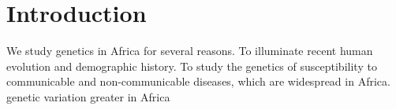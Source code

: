 \chapter{Introduction}
\ifpdf
    \graphicspath{{Introduction/IntroductionFigs/PNG/}{Introduction/IntroductionFigs/PDF/}{Introduction/IntroductionFigs/}}
\else
    \graphicspath{{Introduction/IntroductionFigs/EPS/}{Introduction/IntroductionFigs/}}
\fi

We study genetics in Africa for several reasons. To illuminate recent human evolution and demographic history. To study the genetics of susceptibility to communicable and non-communicable diseases, which are widespread in Africa.
genetic variation greater in Africa\cite{RosenbergScience2002}




